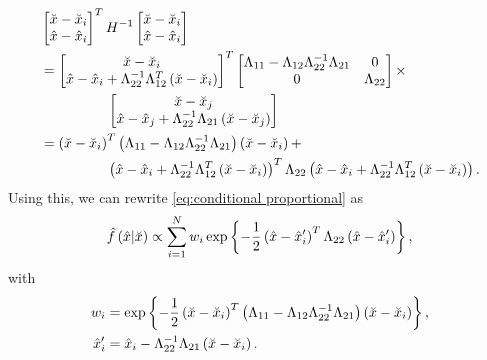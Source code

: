 \begin{align}
	&\begin{bmatrix} 
		\variableparta - \datapointparta{\indexdata} \\ 
		\variablepartb - \datapointpartb{\indexdata} 
	\end{bmatrix}^T 
	\bandwidthmatrix^{-1}
	\begin{bmatrix} 
		\variableparta - \datapointparta{\indexdata} \\ 
		\variablepartb - \datapointpartb{\indexdata} 
	\end{bmatrix} \\
	&= \begin{bmatrix} 
		\variableparta - \datapointparta{\indexdata} \\ 
		\variablepartb - \datapointpartb{\indexdata} + \bwibr^{-1} \bwiur^T \left(\variableparta - \datapointparta{\indexdata} \right)
	\end{bmatrix}^T 
	\begin{bmatrix} 
		\bwiul - \bwiur \bwibr^{-1} \bwibl  & 0 \\ 
		0 & \bwibr 
	\end{bmatrix} \times \nonumber \\
	&\superquad \begin{bmatrix}
		\variableparta - \datapointparta{\indexsampling} \\
		\variablepartb - \datapointpartb{\indexsampling} + \bwibr^{-1}\bwibl \left(\variableparta - \datapointparta{\indexsampling} \right)
	\end{bmatrix} \\
	&= \left(\variableparta - \datapointparta{\indexdata}\right)^T 
	\left(\bwiul - \bwiur \bwibr^{-1} \bwibl\right) 
	\left(\variableparta - \datapointparta{\indexdata}\right) + \nonumber \\
	&\superquad \left( \variablepartb - \datapointpartb{\indexdata} + \bwibr^{-1} \bwiur^T \left(\variableparta - \datapointparta{\indexdata} \right) \right)^T
	\bwibr \left( \variablepartb - \datapointpartb{\indexdata} + \bwibr^{-1} \bwiur^T \left(\variableparta - \datapointparta{\indexdata} \right) \right).
\end{align}
Using this, we can rewrite \cref{eq:conditional proportional} as
\begin{equation}
	\label{eq:final conditional hard}
	\hat{f}\left(  \hat{x} | \breve{x}  \right) 
	\propto \sum_{i=1}^{N} w_{i}
	\exp\left\{  -\frac{1}{2} \left( \hat{x} - \hat{x}_{i}' \right)^T \Lambda_{22} \left( \hat{x} - \hat{x}_{i}' \right) \right\},
\end{equation}
with
\begin{align}
	\label{eq:weights conditional hard}
	w_{i} &= \exp\left\{ 
		-\frac{1}{2} \left(\breve{x} - \breve{x}_{i}\right)^T 
		\left(\Lambda_{11} - \Lambda_{12} \Lambda_{22}^{-1} \Lambda_{21}\right) 
		\left(\breve{x} - \breve{x}_{i}\right) \right\}, \\
	\label{eq:offset conditional hard}
	\hat{x}_{i}' &= \hat{x}_{i} - \Lambda_{22}^{-1}\Lambda_{21} \left(\breve{x} - \breve{x}_{i} \right).
\end{align}

